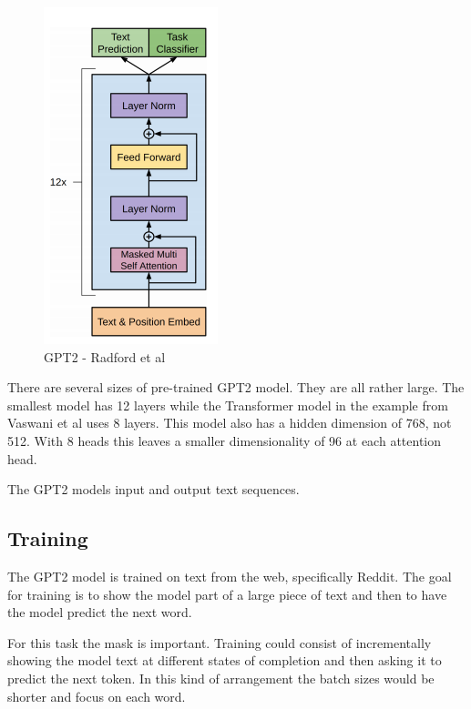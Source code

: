\begin{figure}[H]
	\begin{center}
		
		
		\includegraphics[scale=3.0]{diagram-mat05}
	\end{center}
	\caption[Generative Pre-Training 2 ]{GPT2 - Radford et al \cite{radford2018improving}}
	

\end{figure}

There are several sizes of pre-trained GPT2 model. They are all rather large. The smallest model has 12 layers while the Transformer model in the example from Vaswani et al \cite{Vaswani2017AttentionIA} uses 8 layers. This model also has a hidden dimension of 768, not 512. With 8 heads this leaves a smaller dimensionality of 96 at each attention head. 

The GPT2 models input and output text sequences.


\subsection{Training}

The GPT2 model is trained on text from the web, specifically Reddit. The goal for training is to show the model part of a large piece of text and then to have the model predict the next word. 

For this task the mask is important. Training could consist of incrementally showing the model text at different states of completion and then asking it to predict the next token. In this kind of arrangement the batch sizes would be shorter and focus on each word. 

